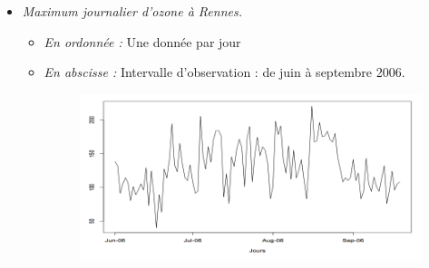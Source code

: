 \begin{itemize}
\item \textit{Maximum journalier d'ozone à Rennes.}
\begin{itemize}
\item \textit{En ordonnée :} Une donnée par jour
\item \textit{En abscisse :} Intervalle d'observation : de juin à septembre 2006.
\begin{figure}[H]\begin{center}\includegraphics[scale=0.5]{ilu/ccm25.png}\end{center}\end{figure}
\end{itemize}
\end{itemize}

